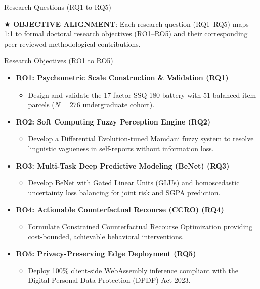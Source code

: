 \documentclass{beamer}
\begin{document}
\begin{frame}[t]{Research Questions (RQ1 to RQ5)}
  \begin{takeawaybanner}
    \fontsize{4.8pt}{5.8pt}\selectfont
    \textbf{\color{GoldPill}$\bigstar$ OBJECTIVE ALIGNMENT}: Each research question (RQ1--RQ5) maps 1:1 to formal doctoral research objectives (RO1--RO5) and their corresponding peer-reviewed methodological contributions.
  \end{takeawaybanner}
\end{frame}

\begin{frame}{Research Objectives (RO1 to RO5)}
  \begin{itemize}\setlength{\itemsep}{5pt}\small
    \item \textbf{RO1: Psychometric Scale Construction \& Validation (RQ1)}
    \begin{itemize}
      \item Design and validate the 17-factor SSQ-180 battery with 51 balanced item parcels ($N=276$ undergraduate cohort).
    \end{itemize}
    
    \item \textbf{RO2: Soft Computing Fuzzy Perception Engine (RQ2)}
    \begin{itemize}
      \item Develop a Differential Evolution-tuned Mamdani fuzzy system to resolve linguistic vagueness in self-reports without information loss.
    \end{itemize}
    
    \item \textbf{RO3: Multi-Task Deep Predictive Modeling (BeNet) (RQ3)}
    \begin{itemize}
      \item Develop BeNet with Gated Linear Units (GLUs) and homoscedastic uncertainty loss balancing for joint risk and SGPA prediction.
    \end{itemize}
    
    \item \textbf{RO4: Actionable Counterfactual Recourse (CCRO) (RQ4)}
    \begin{itemize}
      \item Formulate Constrained Counterfactual Recourse Optimization providing cost-bounded, achievable behavioral interventions.
    \end{itemize}
    
    \item \textbf{RO5: Privacy-Preserving Edge Deployment (RQ5)}
    \begin{itemize}
      \item Deploy 100\% client-side WebAssembly inference compliant with the Digital Personal Data Protection (DPDP) Act 2023.
    \end{itemize}
  \end{itemize}
\end{frame}
\end{document}
